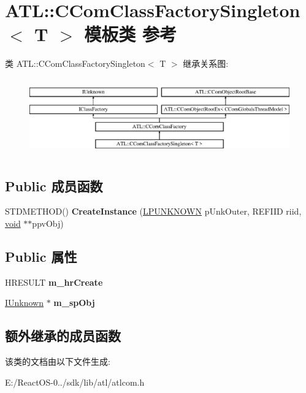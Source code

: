 \hypertarget{class_a_t_l_1_1_c_com_class_factory_singleton}{}\section{A\+TL\+:\+:C\+Com\+Class\+Factory\+Singleton$<$ T $>$ 模板类 参考}
\label{class_a_t_l_1_1_c_com_class_factory_singleton}
类 A\+TL\+:\+:C\+Com\+Class\+Factory\+Singleton$<$ T $>$ 继承关系图\+:\begin{figure}[H]
\begin{center}
\leavevmode
\includegraphics[height=3.353293cm]{class_a_t_l_1_1_c_com_class_factory_singleton}
\end{center}
\end{figure}
\subsection*{Public 成员函数}
\begin{DoxyCompactItemize}
\item 
\mbox{\label{class_a_t_l_1_1_c_com_class_factory_singleton_ab58ea5199beb1b7a7303fcac8beb6103}} 
S\+T\+D\+M\+E\+T\+H\+OD() {\bfseries Create\+Instance} (\hyperlink{interface_i_unknown}{L\+P\+U\+N\+K\+N\+O\+WN} p\+Unk\+Outer, R\+E\+F\+I\+ID riid, \hyperlink{interfacevoid}{void} $\ast$$\ast$ppv\+Obj)
\end{DoxyCompactItemize}
\subsection*{Public 属性}
\begin{DoxyCompactItemize}
\item 
\mbox{\label{class_a_t_l_1_1_c_com_class_factory_singleton_a0eb3b9284d49e0cae4adb9db617a7190}} 
H\+R\+E\+S\+U\+LT {\bfseries m\+\_\+hr\+Create}
\item 
\mbox{\label{class_a_t_l_1_1_c_com_class_factory_singleton_a80d495a3ee0a842b8e3f66093c9853be}} 
\hyperlink{interface_i_unknown}{I\+Unknown} $\ast$ {\bfseries m\+\_\+sp\+Obj}
\end{DoxyCompactItemize}
\subsection*{额外继承的成员函数}


该类的文档由以下文件生成\+:\begin{DoxyCompactItemize}
\item 
E\+:/\+React\+O\+S-\/0../sdk/lib/atl/atlcom.\+h\end{DoxyCompactItemize}
